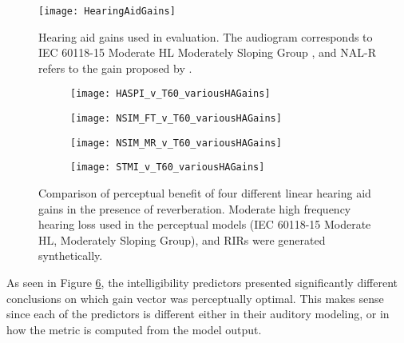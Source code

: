 
\begin{figure}[H]
	\texttt{[image: HearingAidGains]}
	\centering
	\caption[Hearing aid gains considered for use in evaluation]{Hearing aid gains used in evaluation. The audiogram corresponds to IEC 60118-15 Moderate HL Moderately Sloping Group \citep{bisgaard2010standard}, and NAL-R refers to the gain proposed by \cite{byrne1986national}.}
	\label{fig:HA_Gains}
\end{figure}

\begin{figure}[H]
	\centering
	\begin{subfigure}[b]{0.49\textwidth}
		\centering
		\texttt{[image: HASPI\_v\_T60\_variousHAGains]}
		\subcaption{}
		\label{subfig:HA_GainComparison_HASPI}
	\end{subfigure}
	\hfill
	\begin{subfigure}[b]{0.49\textwidth}
		\centering
		\texttt{[image: NSIM\_FT\_v\_T60\_variousHAGains]}
		\subcaption{}
		\label{subfig:HA_GainComparison_NSIM_FT}
	\end{subfigure}
	\hfill
	\begin{subfigure}[b]{0.49\textwidth}
		\centering
		\texttt{[image: NSIM\_MR\_v\_T60\_variousHAGains]}
		\subcaption{}
		\label{subfig:HA_GainComparison_NSIM_MR}
	\end{subfigure}
	\hfill
	\begin{subfigure}[b]{0.49\textwidth}
		\centering
		\texttt{[image: STMI\_v\_T60\_variousHAGains]}
		\subcaption{}
		\label{subfig:HA_GainComparison_STMI}
	\end{subfigure}
	\hfill
	\caption[Comparison of perceptual benefit of hearing aid gains considered for use in evaluation]{Comparison of perceptual benefit of four different linear hearing aid gains in the presence of reverberation. Moderate high frequency hearing loss used in the perceptual models (IEC 60118-15 Moderate HL, Moderately Sloping Group), and RIRs were generated synthetically.}
	\label{fig:HA_GainComparison}
\end{figure}

As seen in Figure \ref{fig:HA_GainComparison}, the intelligibility predictors presented significantly different conclusions on which gain vector was perceptually optimal. This makes sense since each of the predictors is different either in their auditory modeling, or in how the metric is computed from the model output. 

